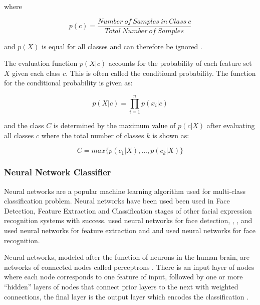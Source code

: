 \documentclass{IEEEtran}
\begin{document}
\begin{center}
where
\end{center}
\begin{equation}
\label{eqn_nb_pclassGivenFeat}
p(c) = \frac{Number \: of \: Samples \: in \: Class \: c}{Total \: Number \: of \: Samples}
\end{equation}

 \cite{lajevardi2012automatic} and $p(X)$ is equal for all classes and can therefore be ignored \cite{rish2001empirical}.


The evaluation function $p(X|c)$ accounts for the probability of each feature set $X$ given each class $c$. This is often called the conditional probability. The function for the conditional probability is given as:

\begin{equation}
\label{eqn_nb_cprob}
p(X|c) = \prod_{i=1}^n p(x_i|c)
\end{equation}

and the class $C$ is determined by the maximum value of $p(c|X)$ after evaluating all classes $c$ where the total number of classes $k$ is shown as:

\begin{equation}
\label{eqn_nb_classify}
C = max \{p(c_1|X),...,p(c_k|X)\}
\end{equation}

\subsubsection{Neural Network Classifier}
Neural networks are a popular machine learning algorithm used for multi-class classification problem. Neural networks have been used been used in Face Detection, Feature Extraction and Classification stages of other facial expression recognition systems with success. \cite{rowley1998nn} used neural networks for face detection, \cite{xie2019deep}, \cite{ioannou2007robust}, and \cite{yu2018eye} used neural networks for feature extraction and \cite{alazzawi2018performance} and \cite{parkhi2015deep} used neural networks for face recognition. 

Neural networks, modeled after the function of neurons in the human brain, are networks of connected nodes called perceptrons \cite{pal1992multilayer}. There is an input layer of nodes where each node corresponds to one feature of input, followed by one or more ``hidden'' layers of nodes that connect prior layers to the next with weighted connections, the final layer is the output layer which encodes the classification \cite{pal1992multilayer}.
\end{document}

